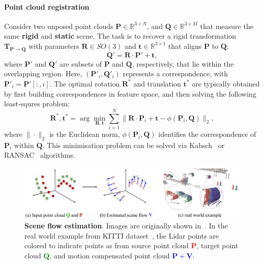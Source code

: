\paragraph{Point cloud registration}
Consider two unposed point clouds $\mathbf{P} \in \mathbb{R}^{3 \times N} $, and $\mathbf{Q} \in \mathbb{R}^{3 \times M}$ that measure the same \textbf{rigid} and \textbf{static} scene. The task is to recover a rigid transformation $\mathbf{T}_{\mathbf{P} \rightarrow \mathbf{Q}}$ with parameters $\mathbf{R} \in SO(3)$ and $\mathbf{t} \in \mathbb{R}^{3 \times 1}$ that aligns %
$\mathbf{P}$ to $\mathbf{Q}$:
\begin{equation}
    \mathbf{Q}' = \mathbf{R} \cdot \mathbf{P}' + \mathbf{t},
\end{equation}
where $\mathbf{P}'$ and $\mathbf{Q}'$ are subsets of $\mathbf{P}$ and $\mathbf{Q}$, respectively, that lie within the overlapping region. Here, $(\mathbf{P}'_i, \mathbf{Q}'_i)$ represents a correspondence, with $\mathbf{P}'_i = \mathbf{P}'[:,i]$.  The optimal rotation $\mathbf{R}^*$ and translation $\mathbf{t}^*$ are typically obtained by first building correspondences in feature space, and then solving the following least-squres problem:
\begin{equation}
    \mathbf{R}^*, \mathbf{t}^* = \arg \min_{\mathbf{R}, \mathbf{t}} \sum_{i=1}^N \| \mathbf{R} \cdot \mathbf{P}_i + \mathbf{t} - \phi(\mathbf{P}_i, \mathbf{Q}) \|_2,
\label{eq:bg_registration}
\end{equation}
where $\|\!\cdot\!\|_2$ is the Euclidean norm, $\phi(\mathbf{P}_i, \mathbf{Q})$ identifies the correspondence of $\mathbf{P}_i$ within $\mathbf{Q}$. This minimisation problem can be solved via Kabsch~\cite{kabsch1976solution} or RANSAC~\cite{ransac} algorithms.


\begin{figure}[t]
    \centering
    \includegraphics[width=1.0\columnwidth]{imgs/sceneflow.pdf}
    \caption{\textbf{Scene flow estimation}. Images are originally shown in~\cite{liu2019flownet3d}. In the real world example from KITTI dataset~\cite{geiger2012we}, the Lidar points are colored to indicate points as from source point cloud \textcolor{red}{$\mathbf{P}$}, target point cloud \textcolor{green}{$\mathbf{Q}$}, and motion compensated point cloud \textcolor{blue}{$\mathbf{P} + \mathbf{V}$}.}
    \label{fig:bg_sceneflow}
\end{figure}

